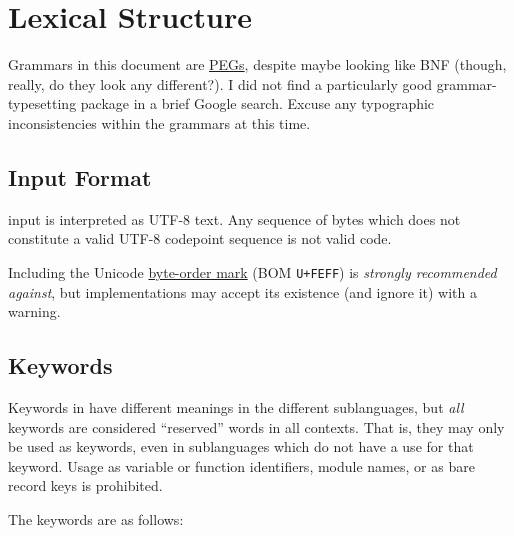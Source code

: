 \section{Lexical Structure}

Grammars in this document are \href{https://en.wikipedia.org/wiki/Parsing_expression_grammar}{PEGs},
despite maybe looking like BNF (though, really, do they look any different?).
I did not find a particularly good grammar-typesetting package in a brief
Google search. Excuse any typographic inconsistencies within the grammars
at this time.

\subsection{Input Format}

\Trilogy{} input is interpreted as UTF-8 text. Any sequence of bytes which
does not constitute a valid UTF-8 codepoint sequence is not valid \Trilogy{}
code.

Including the Unicode \href{https://en.wikipedia.org/wiki/Byte_order_mark}{byte-order mark}
(BOM \texttt{U+FEFF}) is \emph{strongly recommended against}, but \Trilogy{}
implementations may accept its existence (and ignore it) with a warning.

\subsection{Keywords}

Keywords in \Trilogy{} have different meanings in the different
sublanguages, but \emph{all} keywords are considered ``reserved''
words in all contexts. That is, they may only be used as keywords,
even in sublanguages which do not have a use for that keyword.
Usage as variable or function identifiers, module names, or as
bare record keys is prohibited.

The keywords are as follows:

